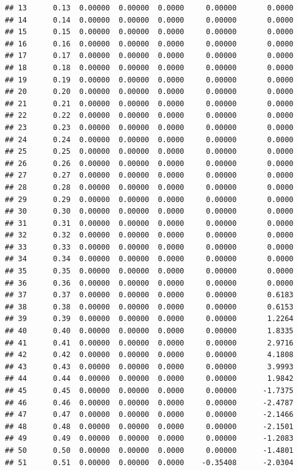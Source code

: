 \documentclass{article}\usepackage[]{graphicx}\usepackage[]{color}
\makeatletter
\newenvironment{kframe}{%
 \def\at@end@of@kframe{}%
 \ifinner\ifhmode%
  \def\at@end@of@kframe{\end{minipage}}%
  \begin{minipage}{\columnwidth}%
 \fi\fi%
 \def\FrameCommand##1{\hskip\@totalleftmargin \hskip-\fboxsep
 \colorbox{shadecolor}{##1}\hskip-\fboxsep
     \hskip-\linewidth \hskip-\@totalleftmargin \hskip\columnwidth}%
 \MakeFramed {\advance\hsize-\width
   \@totalleftmargin\z@ \linewidth\hsize
   \@setminipage}}%
 {\par\unskip\endMakeFramed%
 \at@end@of@kframe}
\newenvironment{knitrout}{}{} %
\makeatother
\begin{document}
\begin{knitrout}
\begin{kframe}
\begin{verbatim}
## 13      0.13  0.00000  0.00000  0.0000     0.00000       0.0000
## 14      0.14  0.00000  0.00000  0.0000     0.00000       0.0000
## 15      0.15  0.00000  0.00000  0.0000     0.00000       0.0000
## 16      0.16  0.00000  0.00000  0.0000     0.00000       0.0000
## 17      0.17  0.00000  0.00000  0.0000     0.00000       0.0000
## 18      0.18  0.00000  0.00000  0.0000     0.00000       0.0000
## 19      0.19  0.00000  0.00000  0.0000     0.00000       0.0000
## 20      0.20  0.00000  0.00000  0.0000     0.00000       0.0000
## 21      0.21  0.00000  0.00000  0.0000     0.00000       0.0000
## 22      0.22  0.00000  0.00000  0.0000     0.00000       0.0000
## 23      0.23  0.00000  0.00000  0.0000     0.00000       0.0000
## 24      0.24  0.00000  0.00000  0.0000     0.00000       0.0000
## 25      0.25  0.00000  0.00000  0.0000     0.00000       0.0000
## 26      0.26  0.00000  0.00000  0.0000     0.00000       0.0000
## 27      0.27  0.00000  0.00000  0.0000     0.00000       0.0000
## 28      0.28  0.00000  0.00000  0.0000     0.00000       0.0000
## 29      0.29  0.00000  0.00000  0.0000     0.00000       0.0000
## 30      0.30  0.00000  0.00000  0.0000     0.00000       0.0000
## 31      0.31  0.00000  0.00000  0.0000     0.00000       0.0000
## 32      0.32  0.00000  0.00000  0.0000     0.00000       0.0000
## 33      0.33  0.00000  0.00000  0.0000     0.00000       0.0000
## 34      0.34  0.00000  0.00000  0.0000     0.00000       0.0000
## 35      0.35  0.00000  0.00000  0.0000     0.00000       0.0000
## 36      0.36  0.00000  0.00000  0.0000     0.00000       0.0000
## 37      0.37  0.00000  0.00000  0.0000     0.00000       0.6183
## 38      0.38  0.00000  0.00000  0.0000     0.00000       0.6153
## 39      0.39  0.00000  0.00000  0.0000     0.00000       1.2264
## 40      0.40  0.00000  0.00000  0.0000     0.00000       1.8335
## 41      0.41  0.00000  0.00000  0.0000     0.00000       2.9716
## 42      0.42  0.00000  0.00000  0.0000     0.00000       4.1808
## 43      0.43  0.00000  0.00000  0.0000     0.00000       3.9993
## 44      0.44  0.00000  0.00000  0.0000     0.00000       1.9842
## 45      0.45  0.00000  0.00000  0.0000     0.00000      -1.7375
## 46      0.46  0.00000  0.00000  0.0000     0.00000      -2.4787
## 47      0.47  0.00000  0.00000  0.0000     0.00000      -2.1466
## 48      0.48  0.00000  0.00000  0.0000     0.00000      -2.1501
## 49      0.49  0.00000  0.00000  0.0000     0.00000      -1.2083
## 50      0.50  0.00000  0.00000  0.0000     0.00000      -1.4801
## 51      0.51  0.00000  0.00000  0.0000    -0.35408      -2.0304

\end{verbatim}
\end{kframe}
\end{knitrout}
\end{document}
